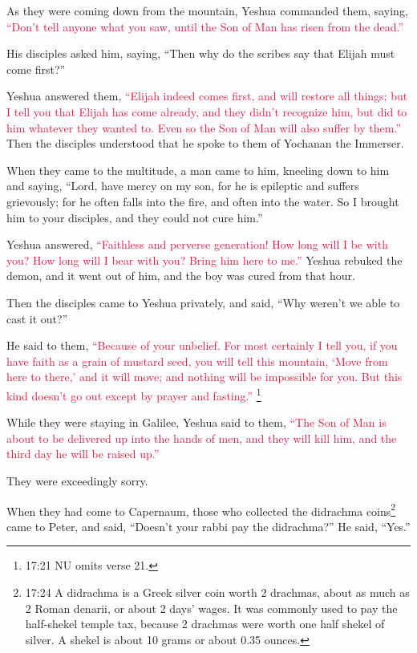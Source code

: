 \myverse{}As they were coming down from the mountain, Yeshua commanded them,
saying,
\textcolor{crimson}{“Don’t tell anyone what you saw, until the Son of Man has risen from the dead.”}

\myverse{}His disciples asked him, saying, “Then why do the scribes say
that Elijah must come first?”

\myverse{}Yeshua answered them,
\textcolor{crimson}{“Elijah indeed comes first, and will restore all things;
}
\myverse{}\textcolor{crimson}{but I tell you that Elijah has come already, and they didn’t recognize
	him, but did to him whatever they wanted to. Even so the Son of Man will also suffer by them.”}
\myverse{}Then the disciples understood that he spoke to them of Yochanan the Immerser.

\myverse{}When they came to the multitude, a man came to him, kneeling
down to him and saying,
\myverse{}“Lord, have mercy on my son, for he is epileptic and suffers grievously;
for he often falls into the fire, and often into the water.
\myverse{}So I brought him to your disciples, and they could not cure him.”

\myverse{}Yeshua answered,
\textcolor{crimson}{“Faithless and perverse generation! How long will I be with you? How long will I bear with you? Bring
	him here to me.”}
\myverse{}Yeshua rebuked the demon, and it went out of him, and the boy was cured from
that hour.

\myverse{}Then the disciples came to Yeshua privately, and said, “Why
weren’t we able to cast it out?”

\myverse{}He said to them,
\textcolor{crimson}{“Because of your unbelief. For most certainly I tell you, if you have faith as a grain of mustard
	seed, you will tell this mountain, ‘Move from here to there,’ and it will move; and nothing will be impossible
	for you.
}
\myverse{}\textcolor{crimson}{But this kind doesn’t go out except by prayer and fasting.”
}\footnote{17:21 NU omits verse 21.}

\myverse{}While they were staying in Galilee, Yeshua said to them,
\textcolor{crimson}{“The Son of Man is about to be delivered up into the hands of men,
}
\myverse{}\textcolor{crimson}{and they will kill him, and the third day he will be raised up.”
}

They were exceedingly sorry.

\myverse{}When they had come to Capernaum, those who collected the didrachma
coins\footnote{17:24 A didrachma is a Greek silver coin worth 2 drachmas, about as much as 2 Roman denarii, or about
	2 days’ wages. It was commonly used to pay the half-shekel temple tax, because 2 drachmas were worth one
	half shekel of silver. A shekel is about 10 grams or about 0.35 ounces.} came to Peter, and said,
“Doesn’t your rabbi pay the didrachma?”
\myverse{}He said, “Yes.”

